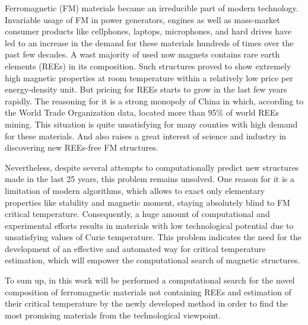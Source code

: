 Ferromagnetic (FM) materials became an irreducible part of modern technology. Invariable usage of FM in power generators, engines as well as mass-market consumer products like cellphones, laptops, microphones, and hard drives have led to an increase in the demand for these materials hundreds of times over the past few decades. A wast majority of used now magnets contains rare earth elements (REEs) in its composition. Such structures proved to show extremely high magnetic properties at room temperature within a relatively low price per energy-density unit. But pricing for REEs starts to grow in the last few years rapidly.
The reasoning for it is a strong monopoly of China in which, according to the World Trade Organization data, located more than 95\% of world REEs mining. This situation is quite unsatisfying for many counties with high demand for these materials. And also raises a great interest of science and industry in discovering new REEs-free FM structures. 

Nevertheless, despite several attempts to computationally predict new structures made in the last 25 years, this problem remains unsolved. One reason for it is a limitation of modern algorithms, which allows to exact only elementary properties like stability and magnetic moment, staying absolutely blind to FM critical temperature. Consequently, a huge amount of computational and experimental efforts results in materials with low technological potential due to unsatisfying values of Curie temperature. This problem indicates the need for the development of an effective and automated way for critical temperature estimation, which will empower the computational search of magnetic structures.

To sum up, in this work will be performed a computational search for the novel composition of ferromagnetic materials not containing REEs and estimation of their critical temperature by the newly developed method in order to find the most promising materials from the technological viewpoint.